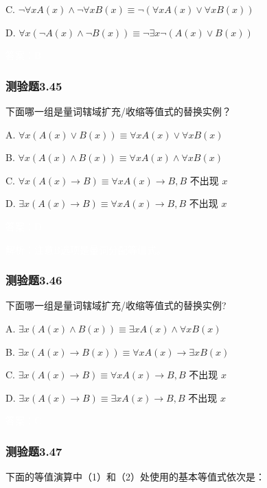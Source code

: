 \documentclass[UTF8, heading=true]{ctexart}
\begin{document}
C. $\neg \forall x A(x) \wedge \neg \forall x B(x) \equiv \neg(\forall x A(x) \vee \forall x B(x))$

D. $\forall x(\neg A(x) \wedge \neg B(x)) \equiv \neg \exists x \neg(A(x) \vee B(x))$


\textcolor{white}{答案：B}

\subsubsection{测验题3.45}

下面哪一组是量词辖域扩充/收缩等值式的替换实例？

A. $\forall x(A(x) \vee B(x)) \equiv \forall x A(x) \vee \forall x B(x)$

B. $\forall x(A(x) \wedge B(x)) \equiv \forall x A(x) \wedge \forall x B(x)$

C. $\forall x(A(x) \rightarrow B) \equiv \forall x A(x) \rightarrow B, B$ 不出现 $x$

D.  $\exists x(A(x) \rightarrow B) \equiv \forall x A(x) \rightarrow B, B$ 不出现 $x$

\textcolor{white}{答案：D}

\textcolor{white}{解析：注意B选项是量词分配等值式。}

\subsubsection{测验题3.46}

下面哪一组是量词辖域扩充/收缩等值式的替换实例?

A. $\exists x(A(x) \wedge B(x)) \equiv \exists x A(x) \wedge \forall x B(x)$

B. $\exists x(A(x) \rightarrow B(x)) \equiv \forall x A(x) \rightarrow \exists x B(x)$

C. $\exists x(A(x) \rightarrow B) \equiv \forall x A(x) \rightarrow B, B$ 不出现 $x$

D. $\exists x(A(x) \rightarrow B) \equiv \exists x A(x) \rightarrow B, B$ 不出现 $x$

\textcolor{white}{答案：C}

\subsubsection{测验题3.47}

下面的等值演算中（1）和（2）处使用的基本等值式依次是：
\end{document}

